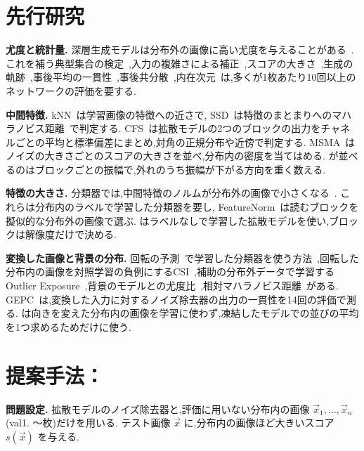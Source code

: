 \section{先行研究}
\label{sec:related}
\textbf{尤度と統計量.} 深層生成モデルは分布外の画像に高い尤度を与えることがある~\cite{nalisnick2019deep,serra2020input}. これを補う典型集合の検定~\cite{nalisnick2019typ},入力の複雑さによる補正~\cite{serra2020input},スコアの大きさ~\cite{mahmood2021msma},生成の軌跡~\cite{heng2024diffpath},事後平均の一貫性~\cite{alexis2026gepc},事後共分散~\cite{shoushtari2026eigenscore},内在次元~\cite{kamkari2024geometric}は,多くが1枚あたり10回以上のネットワークの評価を要する.

\textbf{中間特徴.} kNN~\cite{sun2022knn}は学習画像の特徴への近さで, SSD~\cite{sehwag2021ssd}は特徴のまとまりへのマハラノビス距離~\cite{lee2018mahalanobis}で判定する. CFS~\cite{rouzoumka2026cfs}は拡散モデルの2つのブロックの出力をチャネルごとの平均と標準偏差にまとめ,対角の正規分布や近傍で判定する. MSMA~\cite{mahmood2021msma}はノイズの大きさごとのスコアの大きさを並べ,分布内の密度を当てはめる. \Ours{}が並べるのはブロックごとの振幅で,外れのうち振幅が下がる方向を重く数える.

\textbf{特徴の大きさ.} 分類器では,中間特徴のノルムが分布外の画像で小さくなる~\cite{yu2023featurenorm,park2023featurenorm}. これらは分布内のラベルで学習した分類器を要し, FeatureNorm~\cite{yu2023featurenorm}は読むブロックを擬似的な分布外の画像で選ぶ. \Ours{}はラベルなしで学習した拡散モデルを使い,ブロックは解像度だけで決める.

\textbf{変換した画像と背景の分布.} 回転の予測~\cite{gidaris2018rotnet}で学習した分類器を使う方法~\cite{golan2018geometric,hendrycks2019ss},回転した分布内の画像を対照学習の負例にするCSI~\cite{tack2020csi},補助の分布外データで学習するOutlier Exposure~\cite{hendrycks2019oe},背景のモデルとの尤度比~\cite{ren2019likelihood},相対マハラノビス距離~\cite{ren2021simple}がある. GEPC~\cite{alexis2026gepc}は,変換した入力に対するノイズ除去器の出力の一貫性を14回の評価で測る. \Ours{}は向きを変えた分布内の画像を学習に使わず,凍結したモデルでの並びの平均を1つ求めるためだけに使う.

\section{提案手法：\Ours}
\label{sec:method}
\textbf{問題設定.} 拡散モデルのノイズ除去器と,評価に用いない分布内の画像 $\vec{x}_1,\dots,\vec{x}_n$(val1. \olNRefMin{}〜\olNRefMax{}枚)だけを用いる. テスト画像 $\vec{x}$ に,分布内の画像ほど大きいスコア $s(\vec{x})$ を与える.

